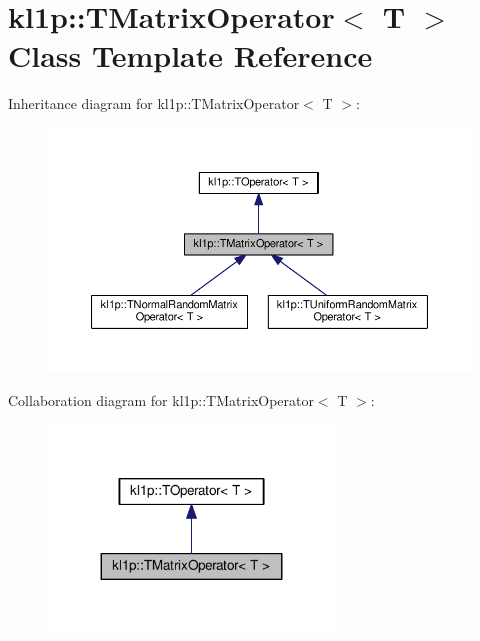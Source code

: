\hypertarget{classkl1p_1_1TMatrixOperator}{}\section{kl1p\+:\+:T\+Matrix\+Operator$<$ T $>$ Class Template Reference}
\label{classkl1p_1_1TMatrixOperator}


Inheritance diagram for kl1p\+:\+:T\+Matrix\+Operator$<$ T $>$\+:
\nopagebreak
\begin{figure}[H]
\begin{center}
\leavevmode
\includegraphics[width=350pt]{classkl1p_1_1TMatrixOperator__inherit__graph}
\end{center}
\end{figure}


Collaboration diagram for kl1p\+:\+:T\+Matrix\+Operator$<$ T $>$\+:
\nopagebreak
\begin{figure}[H]
\begin{center}
\leavevmode
\includegraphics[width=215pt]{classkl1p_1_1TMatrixOperator__coll__graph}
\end{center}
\end{figure}

